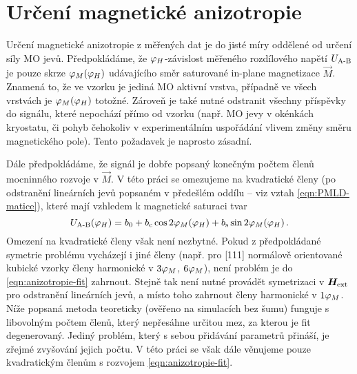 \section{Určení magnetické anizotropie}
\label{chap:urceni-magneticke-anizotropie}

Určení magnetické anizotropie z měřených dat je do jisté míry oddělené od určení síly MO jevů.
Předpokládáme, že $\varphi_H$-závislost měřeného rozdílového napětí $U_\textrm{A-B}$ je pouze skrze $\varphi_M(\varphi_H)$ udávajícího směr saturované in-plane magnetizace $\vec{M}$.
Znamená to, že ve vzorku je jediná MO aktivní vrstva, případně ve všech vrstvách je $\varphi_M(\varphi_H)$ totožné.
Zároveň je také nutné odstranit všechny příspěvky do signálu, které nepochází přímo od vzorku (např. MO jevy v okénkách kryostatu, či pohyb čehokoliv v experimentálním uspořádání vlivem změny směru magnetického pole).
Tento požadavek je naprosto zásadní.

Dále předpokládáme, že signál je dobře popsaný konečným počtem členů mocninného rozvoje v $\vec{M}$.
V této práci se omezujeme na kvadratické členy (po odstranění lineárních jevů popsaném v předešlém oddílu -- viz vztah \eqref{eqn:PMLD-matice}), které mají vzhledem k magnetické saturaci tvar
\begin{equation}
\label{eqn:anizotropie-fit}
    U_\textrm{A-B}(\varphi_H) = b_0 + b_\textrm{c} \cos2\varphi_M(\varphi_H) + b_\textrm{s} \sin2\varphi_M(\varphi_H) \,.
\end{equation}
Omezení na kvadratické členy však není nezbytné.
Pokud z předpokládané symetrie problému vycházejí i jiné členy (např. pro [111] normálově orientované kubické vzorky členy harmonické v $3\varphi_M$, $6\varphi_M$), není problém je do \eqref{eqn:anizotropie-fit} zahrnout.
Stejně tak není nutné provádět symetrizaci v $\bm{H}_\textrm{ext}$ pro odstranění lineárních jevů, a místo toho zahrnout členy harmonické v $1\varphi_M$.
Níže popsaná metoda teoreticky (ověřeno na simulacích bez šumu) funguje s libovolným počtem členů, který nepřesáhne určitou mez, za kterou je fit degenerovaný.
Jediný problém, který s sebou přidávání parametrů přináší, je zřejmé zvyšování jejich počtu.
V této práci se však dále věnujeme pouze kvadratickým členům s rozvojem \eqref{eqn:anizotropie-fit}.

